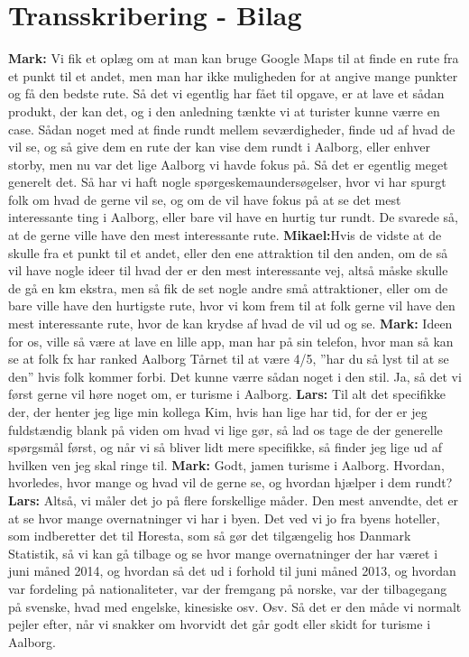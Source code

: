 \chapter{Transskribering - Bilag}
\textbf{Mark:} Vi fik et oplæg om at man kan bruge Google Maps til at finde en rute fra et punkt til et andet, men man har ikke muligheden for at angive mange punkter og få den bedste rute. Så det vi egentlig har fået til opgave, er at lave et sådan produkt, der kan det, og i den anledning tænkte vi at turister kunne værre en case. Sådan noget med at finde rundt mellem seværdigheder, finde ud af hvad de vil se, og så give dem en rute der kan vise dem rundt i Aalborg, eller enhver storby, men nu var det lige Aalborg vi havde fokus på. Så det er egentlig meget generelt det. Så har vi haft nogle spørgeskemaundersøgelser, hvor vi har spurgt folk om hvad de gerne vil se, og om de vil have fokus på at se det mest interessante ting i Aalborg, eller bare vil have en hurtig tur rundt. De svarede så, at de gerne ville have den mest interessante rute. \newline
\textbf{Mikael:}Hvis de vidste at de skulle fra et punkt til et andet, eller den ene attraktion til den anden, om de så vil have nogle ideer til hvad der er den mest interessante vej, altså måske skulle de gå en km ekstra, men så fik de set nogle andre små attraktioner, eller om de bare ville have den hurtigste rute, hvor vi kom frem til at folk gerne vil have den mest interessante rute, hvor de kan krydse af hvad de vil ud og se. \newline
\textbf{Mark:} Ideen for os, ville så være at lave en lille app, man har på sin telefon, hvor man så kan se at folk fx har ranked Aalborg Tårnet til at være 4/5, ”har du så lyst til at se den” hvis folk kommer forbi. Det kunne værre sådan noget i den stil. Ja, så det vi først gerne vil høre noget om, er turisme i Aalborg. \newline
\textbf{Lars:} Til alt det specifikke der, der henter jeg lige min kollega Kim, hvis han lige har tid, for der er jeg fuldstændig blank på viden om hvad vi lige gør, så lad os tage de der generelle spørgsmål først, og når vi så bliver lidt mere specifikke, så finder jeg lige ud af hvilken ven jeg skal ringe til. \newline
\textbf{Mark:} Godt, jamen turisme i Aalborg. Hvordan, hvorledes, hvor mange og hvad vil de gerne se, og hvordan hjælper i dem rundt? \newline
\textbf{Lars:} Altså, vi måler det jo på flere forskellige måder. Den mest anvendte, det er at se hvor mange overnatninger vi har i byen. Det ved vi jo fra byens hoteller, som indberetter det til Horesta, som så gør det tilgængelig hos Danmark Statistik, så vi kan gå tilbage og se hvor mange overnatninger der har været i juni måned 2014, og hvordan så det ud i forhold til juni måned 2013, og hvordan var fordeling på nationaliteter, var der fremgang på norske, var der tilbagegang på svenske, hvad med engelske, kinesiske osv. Osv. Så det er den måde vi normalt pejler efter, når vi snakker om hvorvidt det går godt eller skidt for turisme i Aalborg. \newline
